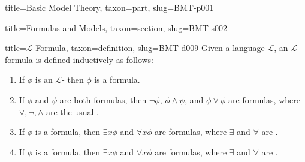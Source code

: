 \documentclass[a4paper]{article}
\begin{document}
\begin{tree}{title={Basic Model Theory}, taxon={part}, slug={BMT-p001}}
\begin{tree}{title={Formulas and Models}, taxon={section}, slug={BMT-s002}}
\begin{tree}{title={\(\mathcal {L}\)-Formula}, taxon={definition}, slug={BMT-d009}}
Given a language \(\mathcal {L}\), an \(\mathcal {L}\)-formula is defined inductively as follows:\par{\begin{enumerate}
\item{
            If \(\phi\) is an \(\mathcal {L}\)- then \(\phi\) is a formula.
        }
        \item{
            If \(\phi\) and \(\psi\) are both formulas, then \(\neg \phi\), \(\phi   \land   \psi\), and 
            \(\phi \lor \phi\) are formulas, where \(\lor , \neg , \land\) are the usual .
        }
        \item{
            If \(\phi\) is a formula, then \(\exists  x  \phi\) and \(\forall  x  \phi\) are formulas, 
            where \(\exists\) and \(\forall\) are .
        }
        \item{
            If \(\phi\) is a formula, then \(\exists  x  \phi\) and \(\forall  x  \phi\) are formulas, 
            where \(\exists\) and \(\forall\) are .
        }
\end{enumerate}}
\end{tree}

\end{tree}


  
  

\end{tree}
\end{document}
